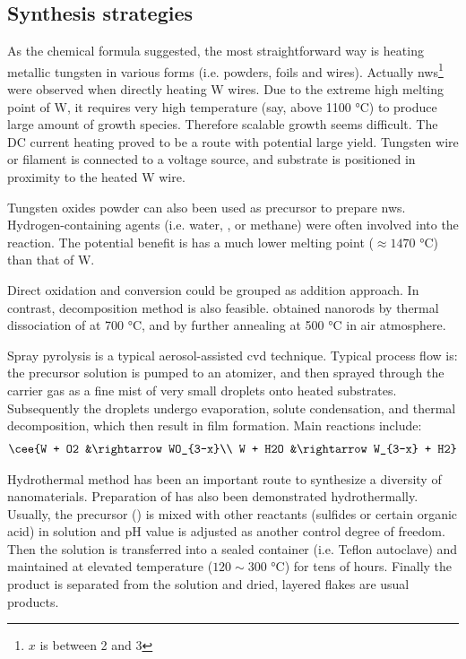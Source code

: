 \subsection{Synthesis strategies}\label{sec:woxgrowth}

As the chemical formula suggested, the most straightforward way is heating metallic tungsten in various forms (i.e. powders,\cite{Zhou2005a,Cao2009,Hsieh2010} foils and wires). Actually  \glspl{nw}\footnote{$x$ is between 2 and 3} were observed when directly heating W wires.\cite{Gu2002a} Due to the extreme high melting point of W, it requires very high temperature (say, above 1100 \si{\degreeCelsius}) to produce large amount of growth species. Therefore scalable growth seems difficult. The DC current heating proved to be a route with potential large yield. Tungsten wire or filament is connected to a voltage source, and substrate is positioned in proximity to the heated W wire.\cite{Lingfei2006,Thangala2007,Chang2007}

Tungsten oxides powder can also been used as precursor to prepare  \glspl{nw}.\cite{Huang2008a,Wang2009} Hydrogen-containing agents (i.e. water, , or methane\cite{Klinke2005}) were often involved into the reaction.\cite{Baek2007,Karuppanan2007} The potential benefit is  has a much lower melting point ($\approx 1470$ \si{\degreeCelsius}) than that of W.

Direct oxidation and  conversion could be grouped as addition approach. In contrast, decomposition method is also feasible. \citeauthor{Pol2005} obtained  nanorods by thermal dissociation of  at 700 \si{\degreeCelsius}, and  by further annealing at 500 \si{\degreeCelsius} in air atmosphere.\cite{Pol2005}

Spray pyrolysis is a typical aerosol-assisted \gls{cvd} technique. Typical process flow is: the precursor solution is pumped to an atomizer, and then sprayed through the carrier gas as a fine mist of very small droplets onto heated substrates. Subsequently the droplets undergo evaporation, solute condensation, and thermal decomposition, which then result in film formation.\cite{Zheng2011} Main reactions include:
\begin{align}
\cee{W + O2 &\rightarrow WO_{3-x}\\
W + H2O &\rightarrow  W_{3-x} + H2}
\end{align}

Hydrothermal method has been an important route to synthesize a diversity of nanomaterials. Preparation of  has also been demonstrated hydrothermally.\cite{Lee2003,Gu2007} Usually, the precursor () is mixed with other reactants (sulfides or certain organic acid) in solution and pH value is adjusted as another control degree of freedom. Then the solution is transferred into a sealed container (i.e. Teflon autoclave) and maintained at elevated temperature ($120 \sim 300$ \si{\degreeCelsius}) for tens of hours. Finally the product is separated from the solution and dried, layered  flakes are usual products.


